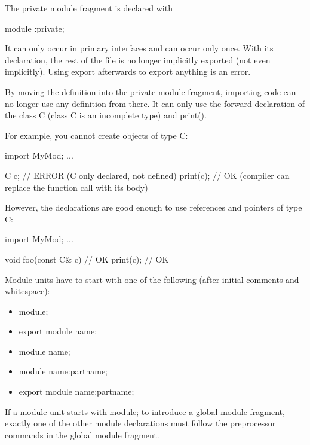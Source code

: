The private module fragment is declared with

\begin{cpp}
module :private;
\end{cpp}

It can only occur in primary interfaces and can occur only once. With its declaration, the rest of the file is no longer implicitly exported (not even implicitly). Using export afterwards to export anything is an error.

By moving the definition into the private module fragment, importing code can no longer use any definition from there. It can only use the forward declaration of the class C (class C is an incomplete type) and print().

For example, you cannot create objects of type C:

\begin{cpp}
import MyMod;
...

C c; // ERROR (C only declared, not defined)
print(c); // OK (compiler can replace the function call with its body)
\end{cpp}

However, the declarations are good enough to use references and pointers of type C:

\begin{cpp}
import MyMod;
...

void foo(const C& c) { // OK
	print(c); // OK
}
\end{cpp}


Module units have to start with one of the following (after initial comments and whitespace):

\begin{itemize}
\item 
module;

\item 
export module name;

\item 
module name;

\item 
module name:partname;

\item 
export module name:partname;
\end{itemize}

If a module unit starts with module; to introduce a global module fragment, exactly one of the other module declarations must follow the preprocessor commands in the global module fragment.

